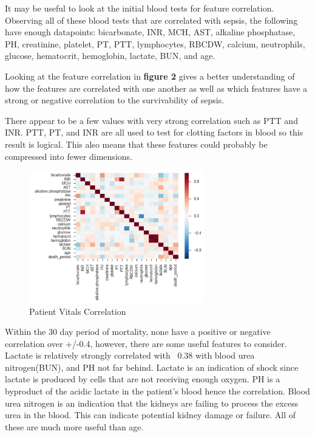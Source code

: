 \documentclass[11pt]{article}
\begin{document}
	It may be useful to look at the initial blood tests for feature correlation. Observing all of these blood tests that are correlated with sepsis, the following have enough datapoints: bicarbonate, INR, MCH, AST, alkaline phosphatase, PH, creatinine, platelet, PT, PTT, lymphocytes, RBCDW, calcium, neutrophils, glucose, hematocrit, hemoglobin, lactate, BUN, and age.
	
	Looking at the feature correlation in \textbf{figure 2} gives a better understanding of how the features are correlated with one another as well as which features have a strong or negative correlation to the survivability of sepsis.
	
	
	There appear to be a few values with very strong correlation such as PTT and INR. PTT, PT, and INR are all used to test for clotting factors in blood so this result is logical. This also means that these features could probably be compressed into fewer dimensions.
	
	\begin{figure}
		\begin{center}
			\includegraphics[width=0.68\textwidth]{feature_correlation.png}
		\end{center}
		\caption{Patient Vitals Correlation}
	\end{figure}
	
	Within the 30 day period of mortality, none have a positive or negative correlation over +/-0.4, however, there are some useful features to consider. Lactate is relatively strongly correlated with ~0.38 with blood urea nitrogen(BUN), and PH not far behind. Lactate is an indication of shock since lactate is produced by cells that are not receiving enough oxygen. PH is a byproduct of the acidic lactate in the patient's blood hence the correlation. Blood urea nitrogen is an indication that the kidneys are failing to process the excess urea in the blood. This can indicate potential kidney damage or failure. All of these are much more useful than age.
	
\end{document}
